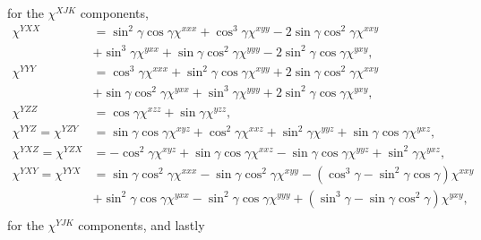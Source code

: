 \documentclass[aps,prb,10pt,letterpaper,notitlepage]{revtex4-1}
\begin{document}
for the $\chi^{XJK}$ components,
\begin{equation*}
\begin{split}
\chi^{YXX}
&=  \sin^{2}\gamma \cos\gamma \chi^{xxx}
 +  \cos^{3}\gamma          \chi^{xyy}
 - 2\sin\gamma \cos^{2}\gamma \chi^{xxy}\\
&+  \sin^{3}\gamma          \chi^{yxx}
 +  \sin\gamma \cos^{2}\gamma \chi^{yyy}
 - 2\sin^{2}\gamma \cos\gamma \chi^{yxy},\\[10pt]
\chi^{YYY}
&=  \cos^{3}\gamma          \chi^{xxx}
 +  \sin^{2}\gamma \cos\gamma \chi^{xyy}
 + 2\sin\gamma \cos^{2}\gamma \chi^{xxy}\\
&+  \sin\gamma \cos^{2}\gamma \chi^{yxx}
 +  \sin^{3}\gamma          \chi^{yyy}
 + 2\sin^{2}\gamma \cos\gamma \chi^{yxy},\\[10pt]
\chi^{YZZ}
&= \cos\gamma \chi^{xzz} + \sin\gamma \chi^{yzz},\\[10pt]
\chi^{YYZ} = \chi^{YZY}
&= \sin\gamma \cos\gamma \chi^{xyz}
 + \cos^{2}\gamma      \chi^{xxz}
 + \sin^{2}\gamma      \chi^{yyz}
 + \sin\gamma \cos\gamma \chi^{yxz},\\[10pt]
\chi^{YXZ} = \chi^{YZX}
&=
- \cos^{2}\gamma      \chi^{xyz}
+ \sin\gamma \cos\gamma \chi^{xxz}
- \sin\gamma \cos\gamma \chi^{yyz}
+ \sin^{2}\gamma      \chi^{yxz},\\[10pt]
\chi^{YXY} = \chi^{YYX}
&= \sin\gamma \cos^{2}\gamma \chi^{xxx}
 - \sin\gamma \cos^{2}\gamma \chi^{xyy}
 - (\cos^{3}\gamma - \sin^{2}\gamma \cos\gamma) \chi^{xxy}\\
&+ \sin^{2}\gamma \cos\gamma \chi^{yxx}
 - \sin^{2}\gamma \cos\gamma \chi^{yyy}
 + (\sin^{3}\gamma - \sin\gamma \cos^{2}\gamma) \chi^{yxy},\\[10pt]
\end{split}
\end{equation*}
for the $\chi^{YJK}$ components, and lastly
\end{document}
